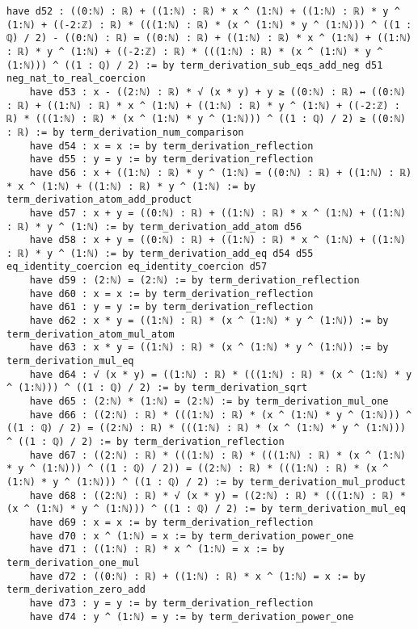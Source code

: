 \documentclass{article}
\begin{document}
\begin{tcolorbox}[colback=white!10, width=\linewidth]
\begin{lstlisting}[language=Lean4]
    have d52 : ((0:ℕ) : ℝ) + ((1:ℕ) : ℝ) * x ^ (1:ℕ) + ((1:ℕ) : ℝ) * y ^ (1:ℕ) + ((-2:ℤ) : ℝ) * (((1:ℕ) : ℝ) * (x ^ (1:ℕ) * y ^ (1:ℕ))) ^ ((1 : ℚ) / 2) - ((0:ℕ) : ℝ) = ((0:ℕ) : ℝ) + ((1:ℕ) : ℝ) * x ^ (1:ℕ) + ((1:ℕ) : ℝ) * y ^ (1:ℕ) + ((-2:ℤ) : ℝ) * (((1:ℕ) : ℝ) * (x ^ (1:ℕ) * y ^ (1:ℕ))) ^ ((1 : ℚ) / 2) := by term_derivation_sub_eqs_add_neg d51 neg_nat_to_real_coercion
    have d53 : x - ((2:ℕ) : ℝ) * √ (x * y) + y ≥ ((0:ℕ) : ℝ) ↔ ((0:ℕ) : ℝ) + ((1:ℕ) : ℝ) * x ^ (1:ℕ) + ((1:ℕ) : ℝ) * y ^ (1:ℕ) + ((-2:ℤ) : ℝ) * (((1:ℕ) : ℝ) * (x ^ (1:ℕ) * y ^ (1:ℕ))) ^ ((1 : ℚ) / 2) ≥ ((0:ℕ) : ℝ) := by term_derivation_num_comparison
    have d54 : x = x := by term_derivation_reflection
    have d55 : y = y := by term_derivation_reflection
    have d56 : x + ((1:ℕ) : ℝ) * y ^ (1:ℕ) = ((0:ℕ) : ℝ) + ((1:ℕ) : ℝ) * x ^ (1:ℕ) + ((1:ℕ) : ℝ) * y ^ (1:ℕ) := by term_derivation_atom_add_product
    have d57 : x + y = ((0:ℕ) : ℝ) + ((1:ℕ) : ℝ) * x ^ (1:ℕ) + ((1:ℕ) : ℝ) * y ^ (1:ℕ) := by term_derivation_add_atom d56
    have d58 : x + y = ((0:ℕ) : ℝ) + ((1:ℕ) : ℝ) * x ^ (1:ℕ) + ((1:ℕ) : ℝ) * y ^ (1:ℕ) := by term_derivation_add_eq d54 d55 eq_identity_coercion eq_identity_coercion d57
    have d59 : (2:ℕ) = (2:ℕ) := by term_derivation_reflection
    have d60 : x = x := by term_derivation_reflection
    have d61 : y = y := by term_derivation_reflection
    have d62 : x * y = ((1:ℕ) : ℝ) * (x ^ (1:ℕ) * y ^ (1:ℕ)) := by term_derivation_atom_mul_atom
    have d63 : x * y = ((1:ℕ) : ℝ) * (x ^ (1:ℕ) * y ^ (1:ℕ)) := by term_derivation_mul_eq
    have d64 : √ (x * y) = ((1:ℕ) : ℝ) * (((1:ℕ) : ℝ) * (x ^ (1:ℕ) * y ^ (1:ℕ))) ^ ((1 : ℚ) / 2) := by term_derivation_sqrt
    have d65 : (2:ℕ) * (1:ℕ) = (2:ℕ) := by term_derivation_mul_one
    have d66 : ((2:ℕ) : ℝ) * (((1:ℕ) : ℝ) * (x ^ (1:ℕ) * y ^ (1:ℕ))) ^ ((1 : ℚ) / 2) = ((2:ℕ) : ℝ) * (((1:ℕ) : ℝ) * (x ^ (1:ℕ) * y ^ (1:ℕ))) ^ ((1 : ℚ) / 2) := by term_derivation_reflection
    have d67 : ((2:ℕ) : ℝ) * (((1:ℕ) : ℝ) * (((1:ℕ) : ℝ) * (x ^ (1:ℕ) * y ^ (1:ℕ))) ^ ((1 : ℚ) / 2)) = ((2:ℕ) : ℝ) * (((1:ℕ) : ℝ) * (x ^ (1:ℕ) * y ^ (1:ℕ))) ^ ((1 : ℚ) / 2) := by term_derivation_mul_product
    have d68 : ((2:ℕ) : ℝ) * √ (x * y) = ((2:ℕ) : ℝ) * (((1:ℕ) : ℝ) * (x ^ (1:ℕ) * y ^ (1:ℕ))) ^ ((1 : ℚ) / 2) := by term_derivation_mul_eq
    have d69 : x = x := by term_derivation_reflection
    have d70 : x ^ (1:ℕ) = x := by term_derivation_power_one
    have d71 : ((1:ℕ) : ℝ) * x ^ (1:ℕ) = x := by term_derivation_one_mul
    have d72 : ((0:ℕ) : ℝ) + ((1:ℕ) : ℝ) * x ^ (1:ℕ) = x := by term_derivation_zero_add
    have d73 : y = y := by term_derivation_reflection
    have d74 : y ^ (1:ℕ) = y := by term_derivation_power_one

\end{lstlisting}
\end{tcolorbox}
\end{document}

